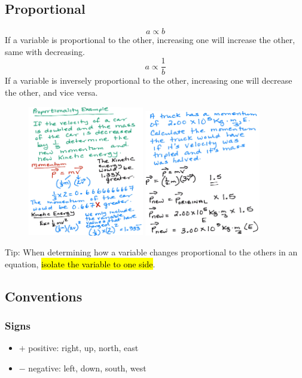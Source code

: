 \documentclass[a4paper,12pt]{article}
\begin{document}
\subsection{Proportional}
\Large $$a \propto b$$ \normalsize
If a variable is proportional to the other, increasing one will increase the other, same with decreasing.
\Large $$a \propto \frac{1}{b}$$ \normalsize
If a variable is inversely proportional to the other, increasing one will decrease the other, and vice versa.
\begin{figure}[H]
    \centering
    \includegraphics[width=0.45\textwidth]{q-prop}
    \includegraphics[width=0.45\textwidth]{q-prop-2}
\end{figure}

Tip: When determining how a variable changes proportional to the others in an equation, \hl{isolate the variable to one side}.

\subsection{Conventions}
\subsubsection{Signs}
\begin{itemize}
    \item{$+$ positive: right, up, north, east}
    \item{$-$ negative: left, down, south, west}
\end{itemize}
\end{document}
